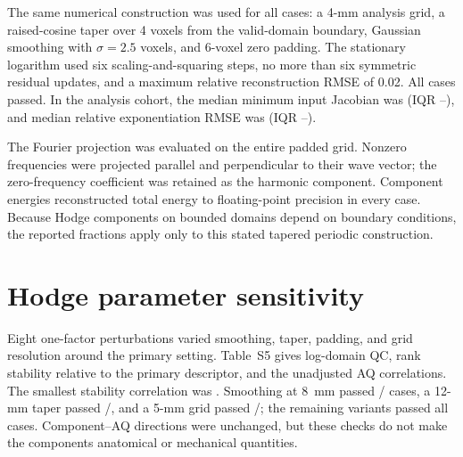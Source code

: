 \documentclass[11pt]{article}
\begin{document}
The same numerical construction was used for all \HodgeExtractionN{} cases: a
4-mm analysis grid, a raised-cosine taper over 4 voxels from the valid-domain
boundary, Gaussian smoothing with $\sigma=2.5$ voxels, and 6-voxel zero padding.
The stationary logarithm used six scaling-and-squaring steps, no more than six
symmetric residual updates, and a maximum relative reconstruction RMSE of
0.02. All \HodgeQCPassN{} cases passed. In the analysis cohort, the median
minimum input Jacobian was \VelocityMinimumJacobianMedian{} (IQR
\VelocityMinimumJacobianQOne--\VelocityMinimumJacobianQThree), and median
relative exponentiation RMSE was \VelocityReconstructionErrorMedian{} (IQR
\VelocityReconstructionErrorQOne--\VelocityReconstructionErrorQThree).

The Fourier projection was evaluated on the entire padded grid. Nonzero
frequencies were projected parallel and perpendicular to their wave vector; the
zero-frequency coefficient was retained as the harmonic component. Component
energies reconstructed total energy to floating-point precision in every case.
Because Hodge components on bounded domains depend on boundary conditions, the
reported fractions apply only to this stated tapered periodic construction.

\section{Hodge parameter sensitivity}

Eight one-factor perturbations varied smoothing, taper, padding, and grid
resolution around the primary setting. Table~S5 gives log-domain QC, rank
stability relative to the primary descriptor, and the unadjusted AQ
correlations. The smallest stability correlation was
\SensitivityTotalStabilityMinimum{}. Smoothing at 8~mm passed
\SensitivitySmoothingEightPassN{}/\HodgeExtractionN{} cases, a 12-mm taper
passed \SensitivityTaperTwelvePassN{}/\HodgeExtractionN{}, and a 5-mm grid
passed \SensitivityGridFivePassN{}/\HodgeExtractionN{}; the remaining variants
passed all \HodgeExtractionN{} cases. Component--AQ directions were unchanged,
but these checks do not make the components anatomical or mechanical
quantities.

\begin{table}[ht]
\centering
\caption{One-factor sensitivity of log-velocity/Hodge descriptors. Stability
columns are Spearman correlations with the primary descriptor; Curl--AQ and
Div--AQ are unadjusted Spearman correlations.}
\label{tab:hodge-sensitivity}
\scriptsize
\resizebox{\textwidth}{!}{}
\end{table}
\end{document}
